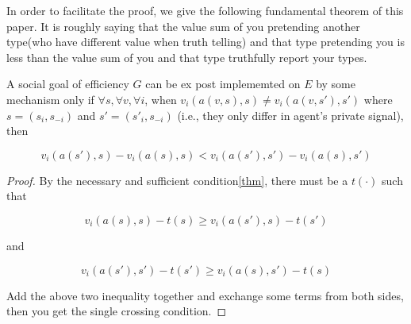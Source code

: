 In order to facilitate the proof, we give the following fundamental theorem of this paper.
It is roughly saying that the value sum of you pretending another type(who have different value when truth telling)
and that type pretending you is less than the value sum of 
you and that type truthfully report your types.

\begin{prop}\label{prop}
A social goal of efficiency $G$ can be ex post implememted on $E$  by some mechanism only if $\forall s, \forall v, \forall i$, when 
$v_i(a(v,s), s)\neq v_i(a(v,s'),s')$ where  $s=(s_i, s_{-i})$ and 
$s'=(s'_i, s_{-i})$ (i.e., they only differ in agent's private signal), then

\begin{equation*}\label{equ}
v_i(a(s'),s)-v_i(a(s), s)<v_i(a(s'),s')-v_i(a(s), s')
\end{equation*}

\end{prop}

\begin{proof}
By the necessary and sufficient condition\ref{thm}, there must be a $t(\cdot)$ such that

\[v_i(a(s), s) - t(s) \geq v_i(a(s'), s) - t(s') \]

and

\[v_i(a(s'), s') - t(s') \geq v_i(a(s), s') - t(s) \]

Add the above two inequality together and exchange some terms from both sides, then you get the single crossing condition.


\end{proof}


